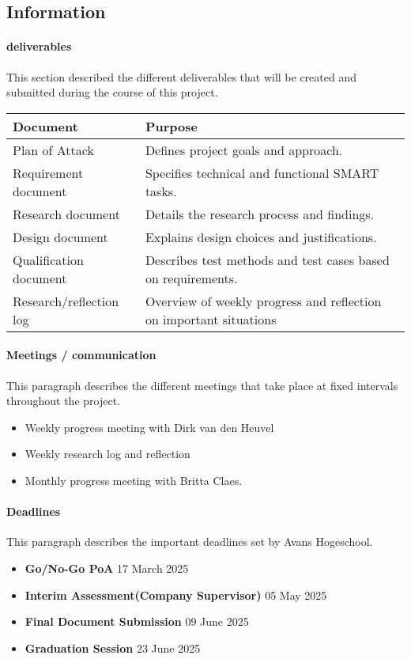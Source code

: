 \documentclass{article}
\begin{document}
\subsection{Information}
\paragraph{deliverables} \par
This section described the different deliverables that will be created and
submitted during the course of this project. 
\begin{center}
    \begin{tabular}{|l|p{8cm}|} 
        \hline 
        \textbf{Document} & \textbf{Purpose} \\
        \hline 
        Plan of Attack & Defines project goals and approach. \\ 
        \hline
        Requirement document & Specifies technical and functional SMART tasks. \\ 
        \hline
        Research document & Details the research process and findings. \\ 
        \hline 
        Design document & Explains design choices and justifications. \\ 
        \hline 
        Qualification document & Describes test methods and test cases based on requirements. \\
        \hline 
        Research/reflection log & Overview of weekly progress and reflection on important situations \\
        \hline
    \end{tabular} 
\end{center}
\paragraph{Meetings / communication} \par
This paragraph describes the different meetings that take place at fixed intervals throughout the project.
\begin{itemize}
    \item Weekly progress meeting with Dirk van den Heuvel
    \item Weekly research log and reflection
    \item Monthly progress meeting with Britta Claes.
\end{itemize}
\paragraph{Deadlines} 
This paragraph describes the important deadlines set by Avans Hogeschool.
\begin{itemize}
    \item \textbf{Go/No-Go PoA} 17 March 2025 
    \item\textbf{Interim Assessment(Company Supervisor)} 05 May 2025 
    \item\textbf{Final Document Submission} 09 June 2025 
    \item \textbf{Graduation Session} 23 June 2025 
\end{itemize}
\end{document}
